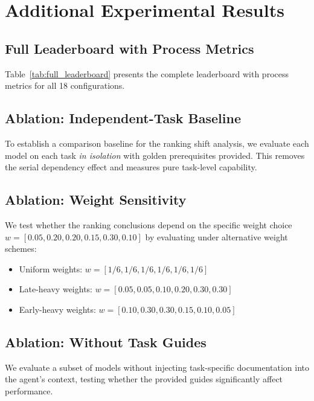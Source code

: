 \section{Additional Experimental Results}

\subsection{Full Leaderboard with Process Metrics}


Table~\ref{tab:full_leaderboard} presents the complete \eva{} leaderboard with process metrics for all 18 configurations.

\subsection{Ablation: Independent-Task Baseline}

To establish a comparison baseline for the ranking shift analysis, we evaluate each model on each task \emph{in isolation} with golden prerequisites provided.
This removes the serial dependency effect and measures pure task-level capability.


\subsection{Ablation: Weight Sensitivity}

We test whether the ranking conclusions depend on the specific weight choice $w = [0.05, 0.20, 0.20, 0.15, 0.30, 0.10]$ by evaluating under alternative weight schemes:
\begin{itemize}[nosep]
\item Uniform weights: $w = [1/6, 1/6, 1/6, 1/6, 1/6, 1/6]$
\item Late-heavy weights: $w = [0.05, 0.05, 0.10, 0.20, 0.30, 0.30]$
\item Early-heavy weights: $w = [0.10, 0.30, 0.30, 0.15, 0.10, 0.05]$
\end{itemize}


\subsection{Ablation: Without Task Guides}

We evaluate a subset of models without injecting task-specific documentation into the agent's context, testing whether the provided guides significantly affect performance.

